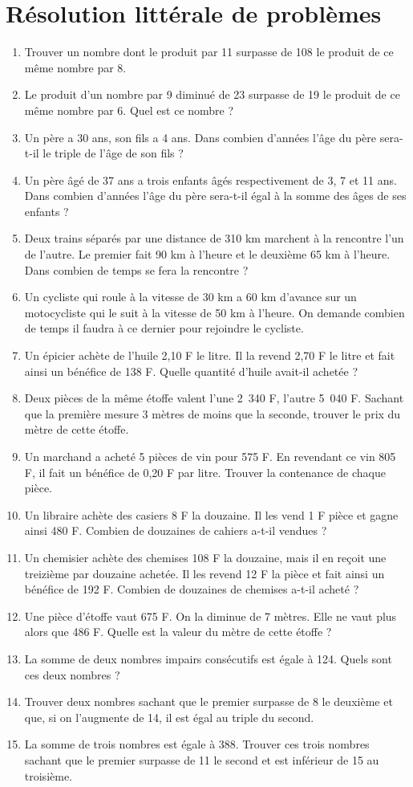 \documentclass[12 pt]{report}
\theoremstyle{plain}
\newcounter{n}
\begin{document}
 \chapter{Résolution littérale de problèmes}
 \begin{enumerate}
 \item Trouver un nombre dont le produit par 11 surpasse de 108 le produit de 
 ce même nombre par 8. 
 \item Le produit d'un nombre par 9 diminué de 23 surpasse de 19 le produit de ce même nombre par 6. Quel est ce nombre ? 
 \item Un père a 30 ans, son fils a 4 ans. Dans combien d'années l'âge du père sera-t-il le triple de l'âge de son fils ?
 \item Un père âgé de 37 ans a trois enfants âgés respectivement de 3, 7 et 11 ans. Dans combien d'années l'âge du père sera-t-il égal à la somme des âges de ses enfants ? 
 \item Deux trains séparés par une distance de 310 km marchent à la rencontre l'un de l'autre. Le premier fait 90 km à l'heure et le deuxième 65 km à l'heure. Dans combien de temps se fera la rencontre ? 
 \item Un cycliste qui roule à la vitesse de 30 km a 60 km d'avance sur un motocycliste qui le suit à la vitesse de 50 km à l'heure. On demande combien de temps il faudra à ce dernier pour rejoindre le cycliste. 
 \item Un épicier achète de l'huile 2,10 F le litre. Il la revend 2,70 F le litre et fait ainsi un bénéfice de 138 F. Quelle quantité d'huile avait-il achetée ? 
 \item Deux pièces de la même étoffe valent l'une 2~340 F, l'autre 5~040 F. Sachant que la première mesure 3 mètres de moins que la seconde, trouver le
 prix du mètre de cette étoffe.
 \item Un marchand a acheté 5 pièces de vin pour 575 F. En revendant ce 
 vin 805 F, il fait un bénéfice de 0,20 F par litre. Trouver la contenance de chaque pièce. 
 \item Un libraire achète des casiers 8 F la douzaine. Il les vend 1 F pièce et gagne ainsi 480 F. Combien de douzaines de cahiers a-t-il vendues ? 
 \item Un chemisier achète des chemises 108 F la douzaine, mais il en 
 reçoit une treizième par douzaine achetée. Il les revend 12 F la pièce et
 fait ainsi un bénéfice de 192 F. Combien de douzaines de chemises a-t-il acheté ?
 \item Une pièce d'étoffe vaut 675 F. On la diminue de 7 mètres. Elle ne vaut plus alors que 486 F. Quelle est la valeur du mètre de cette étoffe ?
 \item La somme de deux nombres impairs consécutifs est égale à 124. Quels sont ces deux nombres ? 
 \item Trouver deux nombres sachant que le premier surpasse de 8 le deuxième et que, si on l'augmente de 14, il est égal au triple du second. 
 \item La somme de trois nombres est égale à 388. Trouver ces trois nombres
 sachant que le premier surpasse de 11 le second et est inférieur de 15 
 au troisième. 
 \end{enumerate}
 
\end{document}
